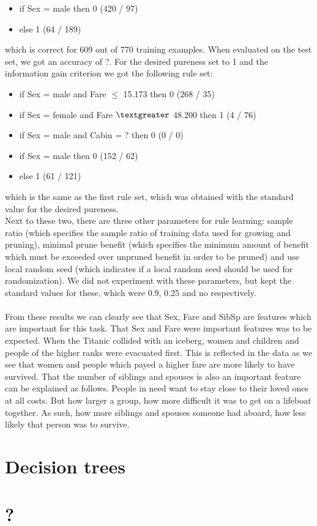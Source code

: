 \documentclass[11pt,a4paper]{article}
\begin{document}
\begin{itemize}

\item if Sex = male then 0  (420 / 97)
\item else 1  (64 / 189)

\end{itemize}
which is correct for 609 out of 770 training examples.
When evaluated on the test set, we got an accuracy of ?.
For the desired pureness set to 1 and the information gain criterion we got the following rule set:
\begin{itemize}

\item if Sex = male and Fare $\leq$ 15.173 then 0  (268 / 35)
\item if Sex = female and Fare $\textgreater$ 48.200 then 1  (4 / 76)
\item if Sex = male and Cabin = ? then 0  (0 / 0)
\item if Sex = male then 0  (152 / 62)
\item else 1  (61 / 121)

\end{itemize}
which is the same as the first rule set, which was obtained with the standard value for the desired pureness.\\
Next to these two, there are three other parameters for rule learning: sample ratio (which specifies the sample ratio of training data used for growing and pruning), minimal prune benefit (which specifies the minimum amount of benefit which must be exceeded over unpruned benefit in order to be pruned) and use local random seed (which indicates if a local random seed should be used for randomization). We did not experiment with these parameters, but kept the standard values for these, which were 0.9, 0.25 and no respectively.\\
\\
From these results we can clearly see that Sex, Fare and SibSp are features which are important for this task. That Sex and Fare were important features was to be expected. When the Titanic collided with an iceberg, women and children and people of the higher ranks were evacuated first. This is reflected in the data as we see that women and people which payed a higher fare are more likely to have survived. That the number of siblings and spouses is also an important feature can be explained as follows. People in need want to stay close to their loved ones at all costs. But how larger a group, how more difficult it was to get on a lifeboat together. As such, how more siblings and spouses someone had aboard, how less likely that person was to survive.

\section{Decision trees}

\section{?}
\end{document}
